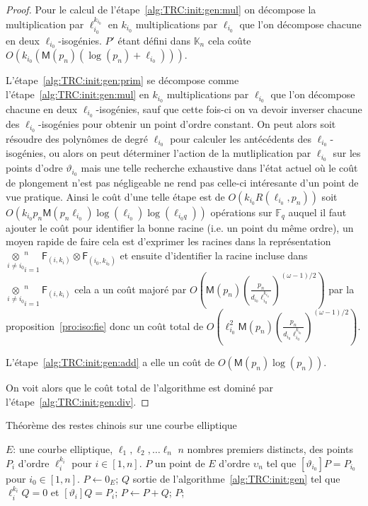 \documentclass[10pt,a4paper]{book}
\theoremstyle{plain}
\theoremstyle{definition}
\theoremstyle{definition}
\theoremstyle{definition}
\theoremstyle{definition}
\theoremstyle{remark}
\theoremstyle{remark}
\theoremstyle{definition}
\begin{document}
\begin{proof}
Pour le calcul de l'étape~\ref{alg:TRC:init:gen:mul} on décompose la 
multiplication par $\ell_{i_0}^{k_{i_0}}$ en $k_{i_0}$ multiplications par 
$\ell_{i_0}$ que l'on décompose chacune en deux $\ell_{i_0}$-isogénies. $P'$ 
étant défini dans $\mathbb{K}_{n}$ cela coûte 
$O(k_{i_0}(\mathsf{M}(p_n)(\log(p_n)+\ell_{i_0})))$.

L'étape~\ref{alg:TRC:init:gen:prim} se décompose comme 
l'étape~\ref{alg:TRC:init:gen:mul} en $k_{i_0}$ multiplications par 
$\ell_{i_0}$ que l'on décompose chacune en deux $\ell_{i_0}$-isogénies, sauf 
que cette fois-ci on va devoir inverser chacune des $\ell_{i_0}$-isogénies pour
obtenir un point d'ordre constant. On peut alors soit résoudre des polynômes de
degré $\ell_{i_0}$ pour calculer les antécédents des $\ell_{i_0}$-isogénies, ou
alors on peut déterminer l'action de la mutliplication par $\ell_{i_0}$ sur les
points d'odre $\vartheta_{i_0}$ mais une telle recherche exhaustive dans l'état
actuel où le coût de plongement n'est pas négligeable ne rend pas celle-ci 
intéresante d'un point de vue pratique. Ainsi le coût d'une telle étape est de 
$O(k_{i_0}R(\ell_{i_0},p_n))$ soit $O(k_{i_0}p_n\mathsf{M}(p_n\ell_{i_0})
\log(\ell_{i_0})\log(\ell_{i_0q}))$ opérations sur $\mathbb{F}_q$ auquel il 
faut ajouter le coût pour identifier la bonne racine (i.e. un point du même 
ordre), un moyen rapide de faire cela est d'exprimer les racines dans la 
représentation $\underset{i\neq i_0}\otimes_{i=1}^n \mathsf{F}_{(i,k_i)} 
\otimes \mathsf{F}_{(i_0,k_{i_0})}$ et ensuite d'identifier la racine incluse
dans $\underset{i\neq i_0}\otimes_{i=1}^n \mathsf{F}_{(i,k_i)}$ cela a un coût 
majoré par 
$O(\mathsf{M}(p_n)(\frac{p_n}{d_{i_0}\ell_{i_0}^{k_{i_0}}})^{(\omega-1)/2})$ 
par la proposition~\ref{pro:iso:fie} donc un coût total de 
$O(\ell_{i_0}^2\mathsf{M}(p_n)(\frac{p_n}{d_{i_0}\ell_{i_0}^{k_{i_0}}})^{(\omega-1)/2})$.

L'étape~\ref{alg:TRC:init:gen:add} a elle un coût de $O(\mathsf{M}(p_n)\log(p_n))$.

On voit alors que le coût total de l'algorithme est dominé par 
l'étape~\ref{alg:TRC:init:gen:div}.
\end{proof}

\begin{algorithm}
\caption{\label{alg:TRC} Théorème des restes chinois sur une courbe elliptique}
\begin{algorithmic}[1]
\REQUIRE $E$: une courbe elliptique, $\ell_1,\ell_2, \dots \ell_n$ $n$ nombres premiers distincts, des points $P_i$ d'ordre $\ell_i^{k_i}$ pour $i \in [1,n]$.
\ENSURE $P$ un point de $E$ d'ordre $\upsilon_n$  tel que $[\vartheta_{i_0} ] P=P_{i_0}$ pour $i_0 \in [1,n]$.
\STATE $P \leftarrow 0_E$;
\STATE $Q$ sortie de l'algorithme~\ref{alg:TRC:init:gen} tel que $\ell_i^{k_i}Q=0$ et $[\vartheta_i]Q=P_i$;
\STATE $P \leftarrow P+Q$; 
\ENDFOR
\RETURN $P$;
\end{algorithmic}
\end{algorithm}
\end{document}
